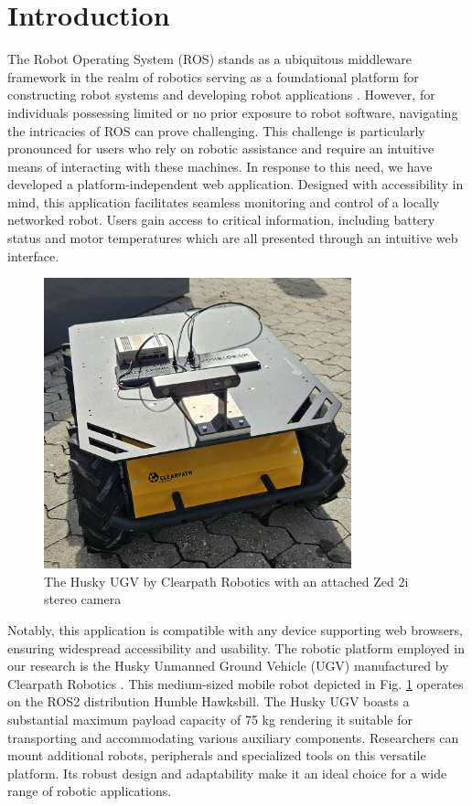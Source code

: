 \documentclass[conference]{IEEEtran}
\begin{document}
\section{Introduction}
The Robot Operating System (ROS) stands as a ubiquitous middleware framework in the realm of robotics serving as a foundational platform for constructing robot systems and developing robot applications \cite{rosOrg}. 
However, for individuals possessing limited or no prior exposure to robot software, navigating the intricacies of ROS can prove challenging. 
This challenge is particularly pronounced for users who rely on robotic assistance and require an intuitive means of interacting with these machines.
In response to this need, we have developed a platform-independent web application. 
Designed with accessibility in mind, this application facilitates seamless monitoring and control of a locally networked robot. Users gain access to critical information, including battery status and motor temperatures which are all presented through an intuitive web interface. 
\begin{figure}[htp]
    \centerline{\includegraphics[width=8.9cm]{Pictures/huskyzed2.jpg}}
    \caption{The Husky UGV by Clearpath Robotics with an attached Zed 2i stereo camera}
    \label{fig:huskyClearpath}
\end{figure}
Notably, this application is compatible with any device supporting web browsers, ensuring widespread accessibility and usability.
The robotic platform employed in our research is the Husky Unmanned Ground Vehicle (UGV) manufactured by Clearpath Robotics \cite{huskyClearpath}. This medium-sized mobile robot depicted in Fig. \ref{fig:huskyClearpath} operates on the ROS2 distribution Humble Hawksbill.
The Husky UGV boasts a substantial maximum payload capacity of 75 kg rendering it suitable for transporting and accommodating various auxiliary components. Researchers can mount additional robots, peripherals and specialized tools on this versatile platform. Its robust design and adaptability make it an ideal choice for a wide range of robotic applications\cite{huskyClearpath}. 
\end{document}
